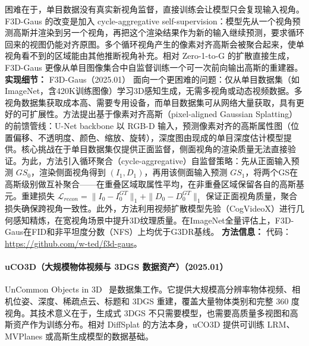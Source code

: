困难在于，单目数据没有真实新视角监督，直接训练会让模型只会复现输入视角。F3D-Gaus 的改变是加入 cycle-aggregative self-supervision：模型先从一个视角预测高斯并渲染到另一个视角，再把这个渲染结果作为新的输入继续预测，要求循环回来的视图仍能对齐原图。多个循环视角产生的像素对齐高斯会被聚合起来，使单视角看不到的区域能由其他推断视角补充。相对 Zero-1-to-G 的扩散直接生成，F3D-Gaus 更像从单目图像集合中自监督训练一个可一次前向输出高斯的重建器。
\textbf{实现细节：} F3D-Gaus（2025.01） 面向一个更困难的问题：仅从单目数据集（如ImageNet，含420K训练图像）学习3D感知生成，无需多视角或动态视频数据。多视角数据集获取成本高、需要专用设备，而单目数据集可从网络大量获取，具有更好的可扩展性。方法提出基于像素对齐高斯（pixel-aligned Gaussian Splatting）的前馈管线：U-Net backbone 以 RGB-D 输入，预测像素对齐的高斯属性图（位置偏移、不透明度、颜色、缩放、旋转），深度图由现成的单目深度估计模型提供。核心挑战在于单目数据集仅提供正面监督，侧面视角的渲染质量无法直接验证。为此，方法引入循环聚合（cycle-aggregative）自监督策略：先从正面输入预测 $GS_0$，渲染侧面视角得到 $(I_1, D_1)$，再用该侧面输入预测 $GS_1$，将两个GS在高斯级别做互补聚合——在重叠区域取属性平均，在非重叠区域保留各自的高斯基元。重建损失 $\mathcal{L}_{recon} = \|I_0 - I_0^{GT}\|_1 + \|D_0 - D_0^{GT}\|_1$ 保证正面视角质量，聚合损失确保跨视角一致性。此外，方法利用视频扩散模型先验（CogVideoX）进行几何感知精炼，在宽视角场景中提升3D纹理质量。在ImageNet全量评估上，F3D-Gaus在FID和非平坦度分数（NFS）上均优于G3DR基线。
\textbf{方法信息：} 代码：\url{https://github.com/w-ted/f3d-gaus}。



\paragraph{uCO3D（大规模物体视频与 3DGS 数据资产）（2025.01）}
UnCommon Objects in 3D~\cite{2501_07574} 是数据集工作。它提供大规模高分辨率物体视频、相机位姿、深度、稀疏点云、标题和 3DGS 重建，覆盖大量物体类别和完整 360 度视角。其技术意义在于，生成式 3DGS 不只需要模型，也需要高质量多视图和高斯资产作为训练分布。相对 DiffSplat 的方法本身，uCO3D 提供可训练 LRM、MVPlanes 或高斯生成模型的数据基础。

